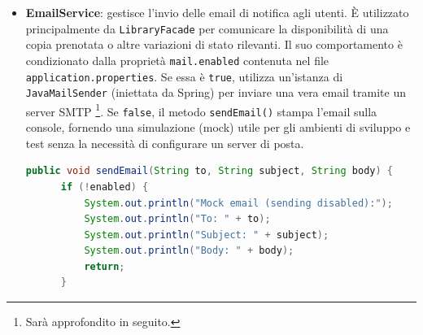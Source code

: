 \documentclass[
  italian,
  paper=a4,
  ,captions=tableheading
]{scrbook}
\newcommand{\passthrough}[1]{#1}
\begin{document}
\begin{itemize}
\item
  \textbf{EmailService}: gestisce l'invio delle email di notifica agli
  utenti. È utilizzato principalmente da
  \passthrough{\lstinline!LibraryFacade!} per comunicare la
  disponibilità di una copia prenotata o altre variazioni di stato
  rilevanti. Il suo comportamento è condizionato dalla proprietà
  \passthrough{\lstinline!mail.enabled!} contenuta nel file
  \passthrough{\lstinline!application.properties!}. Se essa è
  \passthrough{\lstinline!true!}, utilizza un'istanza di
  \passthrough{\lstinline!JavaMailSender!} (iniettata da Spring) per
  inviare una vera email tramite un server SMTP
  \footnote{Sarà approfondito in seguito.}. Se
  \passthrough{\lstinline!false!}, il metodo
  \passthrough{\lstinline!sendEmail()!} stampa l'email sulla console,
  fornendo una simulazione (mock) utile per gli ambienti di sviluppo e
  test senza la necessità di configurare un server di posta.

  \newpage

\begin{lstlisting}[language=Java, language=Java, caption={In questo metodo viene specificato come sono inviate le notifiche agli utenti.}, label={lst:emailservice}, label=lst:emailservice]
  public void sendEmail(String to, String subject, String body) {
      if (!enabled) {
          System.out.println("Mock email (sending disabled):");
          System.out.println("To: " + to);
          System.out.println("Subject: " + subject);
          System.out.println("Body: " + body);
          return;
      }


\end{lstlisting}
\end{itemize}
\end{document}
